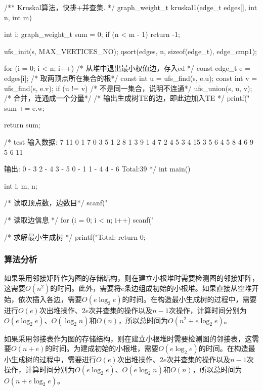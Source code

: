 \begin{Codex}[label=mgraph_kruskal.c]
/** Kruskal算法，快排+并查集. */
graph_weight_t kruskal1(edge_t edges[], int n, int m) {
    int i;
    graph_weight_t sum = 0;
    if (n < m - 1) return -1;

    ufs_init(s, MAX_VERTICES_NO);
    qsort(edges, n, sizeof(edge_t), edge_cmp1);

    for (i = 0; i < n; i++) {
        /* 从堆中退出最小权值边，存入ed */
        const edge_t e = edges[i];
        /* 取两顶点所在集合的根*/
        const int u = ufs_find(s, e.u);
        const int v = ufs_find(s, e.v);
        if (u != v) { /* 不是同一集合，说明不连通*/
            ufs_union(s, u, v); /* 合并，连通成一个分量*/
            /* 输出生成树TE的边，即此边加入TE */
            printf("%
            sum += e.w;
        }
    }

    return sum;
}

/* test
输入数据:
7 11
0 1 7
0 3 5
1 2 8
1 3 9
1 4 7
2 4 5
3 4 15
3 5 6
4 5 8
4 6 9
5 6 11

输出:
0 - 3
2 - 4
3 - 5
0 - 1
1 - 4
4 - 6
Total:39
*/
int main() {
    int i, m, n;

    /* 读取顶点数，边数目*/
    scanf("%

    /* 读取边信息 */
    for (i = 0; i < n; i++) {
        scanf("%
    }

    /* 求解最小生成树 */
    printf("Total:%
    return 0;
}
\end{Codex}

\subsubsection{算法分析}
如果采用邻接矩阵作为图的存储结构，则在建立小根堆时需要检测图的邻接矩阵，这需要$O(n^2)$的时间。此外，需要将$e$条边组成初始的小根堆。如果直接从空堆开始，依次插入各边，需要$O(e\log_2e)$的时间。在构造最小生成树的过程中，需要进行$O(e)$次出堆操作、$2e$次并查集的操作以及$n-1$次操作，计算时间分别为$O(e\log_2e)$、$O(\log_2n)$和$O(n)$，所以总时间为$O(n^2+e\log_2e)$。

如果采用邻接表作为图的存储结构，则在建立小根堆时需要检测图的邻接表，这需要$O(n+e)$的时间。为建成初始的小根堆，需要$O(e\log_2e)$的时间。在构造最小生成树的过程中，需要进行$O(e)$次出堆操作、$2e$次并查集的操作以及$n-1$次操作，计算时间分别为$O(e\log_2e)$、$O(e\log_2n)$和$O(n)$，所以总时间为$O(n+e\log_2e)$。


